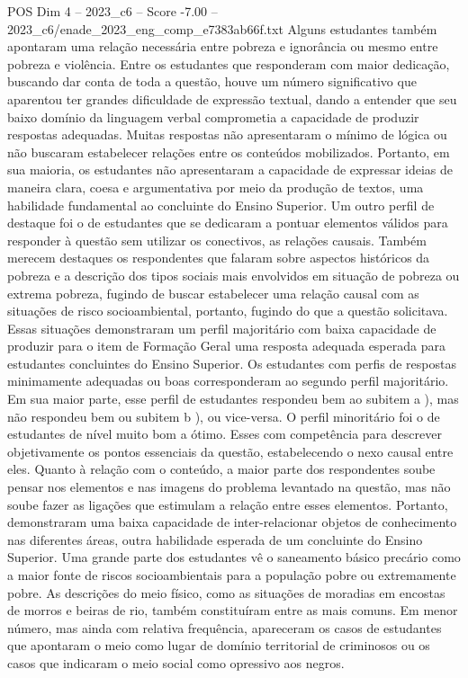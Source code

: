 \begin{textsample}{POS Dim 4 – 2023\_c6 – Score -7.00 – 2023\_c6/enade\_2023\_eng\_comp\_e7383ab66f.txt}
Alguns estudantes também apontaram uma relação necessária entre pobreza e ignorância ou mesmo entre pobreza e violência.
Entre os estudantes que responderam com maior dedicação, buscando dar conta de toda a questão, houve um número significativo que aparentou ter grandes dificuldade de expressão textual, dando a entender que seu baixo domínio da linguagem verbal comprometia a capacidade de produzir respostas adequadas.
Muitas respostas não apresentaram o mínimo de lógica ou não buscaram estabelecer relações entre os conteúdos mobilizados.
Portanto, em sua maioria, os estudantes não apresentaram a capacidade de expressar ideias de maneira clara, coesa e argumentativa por meio da produção de textos, uma habilidade fundamental ao concluinte do Ensino Superior.
Um outro perfil de destaque foi o de estudantes que se dedicaram a pontuar elementos válidos para responder à questão sem utilizar os conectivos, as relações causais.
Também merecem destaques os respondentes que falaram sobre aspectos históricos da pobreza e a descrição dos tipos sociais mais envolvidos em situação de pobreza ou extrema pobreza, fugindo de buscar estabelecer uma relação causal com as situações de risco socioambiental, portanto, fugindo do que a questão solicitava.
Essas situações demonstraram um perfil majoritário com baixa capacidade de produzir para o item de Formação Geral uma resposta adequada esperada para estudantes concluintes do Ensino Superior.
Os estudantes com perfis de respostas minimamente adequadas ou boas corresponderam ao segundo perfil majoritário.
Em sua maior parte, esse perfil de estudantes respondeu bem ao subitem a ), mas não respondeu bem ou subitem b ), ou vice-versa.
O perfil minoritário foi o de estudantes de nível muito bom a ótimo.
Esses com competência para descrever objetivamente os pontos essenciais da questão, estabelecendo o nexo causal entre eles.
Quanto à relação com o conteúdo, a maior parte dos respondentes soube pensar nos elementos e nas imagens do problema levantado na questão, mas não soube fazer as ligações que estimulam a relação entre esses elementos.
Portanto, demonstraram uma baixa capacidade de inter-relacionar objetos de conhecimento nas diferentes áreas, outra habilidade esperada de um concluinte do Ensino Superior.
Uma grande parte dos estudantes vê o saneamento básico precário como a maior fonte de riscos socioambientais para a população pobre ou extremamente pobre.
As descrições do meio físico, como as situações de moradias em encostas de morros e beiras de rio, também constituíram entre as mais comuns.
Em menor número, mas ainda com relativa frequência, apareceram os casos de estudantes que apontaram o meio como lugar de domínio territorial de criminosos ou os casos que indicaram o meio social como opressivo aos negros.

\end{textsample}
